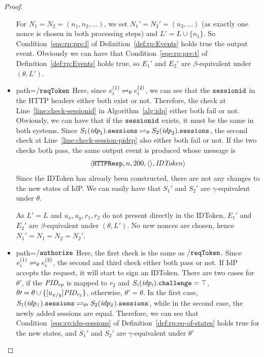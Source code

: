 \begin{proof}
\begin{itemize}
        For $N_1 = N_2 = (n_1, n_2, \dots)$, we set $N_1' = N_2' = (n_2, \dots)$ (as exactly one nonce is chosen in both processing steps) and $L' = L \cup \{n_1\}$. 
        So Condition~\ref{eqe:rp:pre:l} of Definition~\ref{def:rp:Events} holds true the output event.
        Obviously we can have that Condition~\ref{eqe:rp:pre:t} of Definition~\ref{def:rp:Events} holds true, so $E_1'$ and $E_2'$ are $\beta$-equivalent under $(\theta, L')$.
      \item path=$\mathtt{/reqToken}$ 
        Here, since $e_i^{(1)} \rightleftharpoons_{\theta} e_i^{(2)}$, 
        we can see that the $\mathtt{sessionid}$ in the HTTP headers either both exist or not.
        Therefore, the check at Line~\ref{line:check-sessionid} in Algorithm~\ref{alg:idp} either both fail or not. 
        Obviously, we can have that if the $\mathtt{sessionid}$ exists, it must be the same in both systems.
        Since $S_1(\mathit{idp}_1).\mathtt{sessions} \rightleftharpoons_{\theta} S_2(\mathit{idp}_2).\mathtt{sessions}$, 
        the second check at Line~\ref{line:check-session-pidrp} also either both fail or not.
        If the two checks both pass, the same output event is produced whose message is 
        \begin{align*}
          \langle {{}\mathtt{HTTPResp},n,200,\langle {{}} \rangle,\mathit{IDToken}} \rangle
        \end{align*}
        Since the IDToken has already been constructed, there are not any changes to the new states of IdP.
        We can easily have that $S_1\prime$ and $S_2\prime$ are $\gamma$-equivalent under $\theta$. 
        
        As $L' = L$ and $u_x, u_y, r_1, r_2$ do not present directly in the IDToken, $E_1'$ and $E_2'$ are $\beta$-equivalent under $(\theta, L')$.
        No new nonces are chosen, hence $N_1\prime=N_1=N_2=N_2\prime$.
      \item path=$\mathtt{/authorize}$ 
        Here, the first check is the same as $\mathtt{/reqToken}$.
        Since $e_i^{(1)} \rightleftharpoons_{\theta} e_i^{(2)}$, the second and third check either both pass or not.
        If IdP accepts the request, it will start to sign an IDToken.
        There are two cases for $\theta\prime$, if the $\mathit{PID_{rp}}$ is mapped to $r_2$ and $S_i(\mathit{idp_i}).\mathtt{challenge} = \top$, 
        $\theta\prime = \theta \cup \{ [u_{x/y}]\mathit{PID_{r_2}} \}$, otherwise, $\theta\prime = \theta$.
        In the first case, $S_1(\mathit{idp_1}).\mathtt{sessions} \rightleftharpoons_{\theta\prime} S_2(\mathit{idp_2}).\mathtt{sessions}$, 
        while in the second case, the newly added sessions are equal.
        Therefore, we can see that Condition~\ref{eqs:rp:idp-sessions} of Definition~\ref{def:rp:eq-of-states} holds true for the new states, 
        and $S_1\prime$ and $S_2\prime$ are $\gamma$-equivalent under $\theta\prime$


\end{itemize}
\end{proof}
